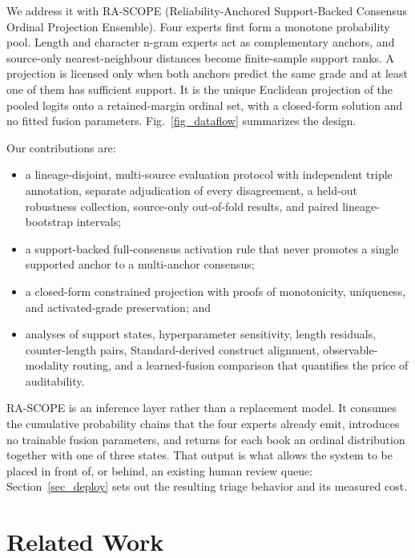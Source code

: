 \documentclass[conference]{IEEEtran}
\begin{document}
We address it with RA-SCOPE (Reliability-Anchored Support-Backed Consensus
Ordinal Projection Ensemble). Four experts first form a monotone probability
pool. Length and character n-gram experts act as complementary anchors, and
source-only nearest-neighbour distances become finite-sample support ranks. A
projection is licensed only when both anchors predict the same grade and at
least one of them has sufficient support. It is the unique Euclidean projection
of the pooled logits onto a retained-margin ordinal set, with a closed-form
solution and no fitted fusion parameters. Fig.~\ref{fig_dataflow} summarizes the
design.

Our contributions are:
\begin{itemize}
\item a lineage-disjoint, multi-source evaluation protocol with independent
triple annotation, separate adjudication of every disagreement, a held-out
robustness collection, source-only out-of-fold results, and paired
lineage-bootstrap intervals;
\item a support-backed full-consensus activation rule that never promotes a
single supported anchor to a multi-anchor consensus;
\item a closed-form constrained projection with proofs of monotonicity,
uniqueness, and activated-grade preservation; and
\item analyses of support states, hyperparameter sensitivity, length residuals,
counter-length pairs, Standard-derived construct alignment,
observable-modality routing, and a learned-fusion comparison that quantifies
the price of auditability.
\end{itemize}

RA-SCOPE is an inference layer rather than a replacement model. It consumes the
cumulative probability chains that the four experts already emit, introduces no
trainable fusion parameters, and returns for each book an ordinal distribution
together with one of three states. That output is what allows the system to be
placed in front of, or behind, an existing human review queue: Section~\ref{sec_deploy}
sets out the resulting triage behavior and its measured cost.

\section{Related Work}
\end{document}
